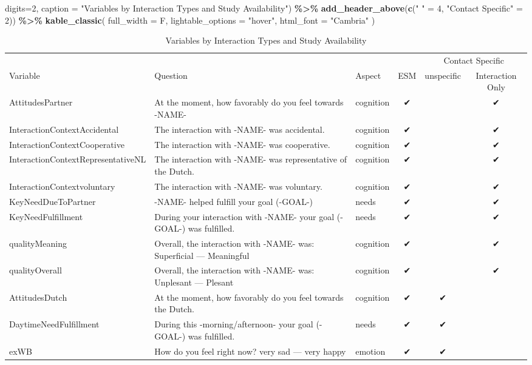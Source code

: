 \documentclass[
]{article}
\newenvironment{Shaded}{\begin{snugshade}}{\end{snugshade}}
\newcommand{\AttributeTok}[1]{\textcolor[rgb]{0.13,0.29,0.53}{#1}}
\newcommand{\DecValTok}[1]{\textcolor[rgb]{0.00,0.00,0.81}{#1}}
\newcommand{\FunctionTok}[1]{\textcolor[rgb]{0.13,0.29,0.53}{\textbf{#1}}}
\newcommand{\NormalTok}[1]{#1}
\newcommand{\OtherTok}[1]{\textcolor[rgb]{0.56,0.35,0.01}{#1}}
\newcommand{\SpecialCharTok}[1]{\textcolor[rgb]{0.81,0.36,0.00}{\textbf{#1}}}
\newcommand{\StringTok}[1]{\textcolor[rgb]{0.31,0.60,0.02}{#1}}
\begin{document}
\begin{Shaded}
\begin{Highlighting}[]
      \AttributeTok{digits=}\DecValTok{2}\NormalTok{,}
      \AttributeTok{caption =} \StringTok{"Variables by Interaction Types and Study Availability"}\NormalTok{) }\SpecialCharTok{\%\textgreater{}\%}
  \FunctionTok{add\_header\_above}\NormalTok{(}\FunctionTok{c}\NormalTok{(}\StringTok{" "} \OtherTok{=} \DecValTok{4}\NormalTok{, }\StringTok{"Contact Specific"} \OtherTok{=} \DecValTok{2}\NormalTok{)) }\SpecialCharTok{\%\textgreater{}\%}
  \FunctionTok{kable\_classic}\NormalTok{(}
    \AttributeTok{full\_width =}\NormalTok{ F,}
    \AttributeTok{lightable\_options =} \StringTok{"hover"}\NormalTok{,}
    \AttributeTok{html\_font =} \StringTok{"Cambria"}
\NormalTok{  )}
\end{Highlighting}
\end{Shaded}

\begin{table}

\caption{\label{tab:variables included in main analysis by response type}Variables by Interaction Types and Study Availability}
\centering
\begin{tabular}[t]{lllccc}
\toprule
\multicolumn{4}{c}{ } & \multicolumn{2}{c}{Contact Specific} \\
\cmidrule(l{3pt}r{3pt}){5-6}
Variable & Question & Aspect & ESM & unspecific & Interaction Only\\
\midrule
AttitudesPartner & At the moment, how favorably do you feel towards -NAME- & cognition & ✔ &  & ✔\\
InteractionContextAccidental & The interaction with -NAME- was accidental. & cognition & ✔ &  & ✔\\
InteractionContextCooperative & The interaction with -NAME- was cooperative. & cognition & ✔ &  & ✔\\
InteractionContextRepresentativeNL & The interaction with -NAME- was representative of the Dutch. & cognition & ✔ &  & ✔\\
InteractionContextvoluntary & The interaction with -NAME- was voluntary. & cognition & ✔ &  & ✔\\
\addlinespace
KeyNeedDueToPartner & -NAME- helped fulfill your goal (-GOAL-) & needs & ✔ &  & ✔\\
KeyNeedFulfillment & During your interaction with -NAME- your goal (-GOAL-) was fulfilled. & needs & ✔ &  & ✔\\
qualityMeaning & Overall, the interaction with -NAME- was: Superficial --- Meaningful & cognition & ✔ &  & ✔\\
qualityOverall & Overall, the interaction with -NAME- was: Unplesant --- Plesant & cognition & ✔ &  & ✔\\
AttitudesDutch & At the moment, how favorably do you feel towards the Dutch. & cognition & ✔ & ✔ & \\
\addlinespace
DaytimeNeedFulfillment & During this -morning/afternoon- your goal (-GOAL-) was fulfilled. & needs & ✔ & ✔ & \\
exWB & How do you feel right now? very sad --- very happy & emotion & ✔ & ✔ & \\
\bottomrule
\end{tabular}
\end{table}
\end{document}
